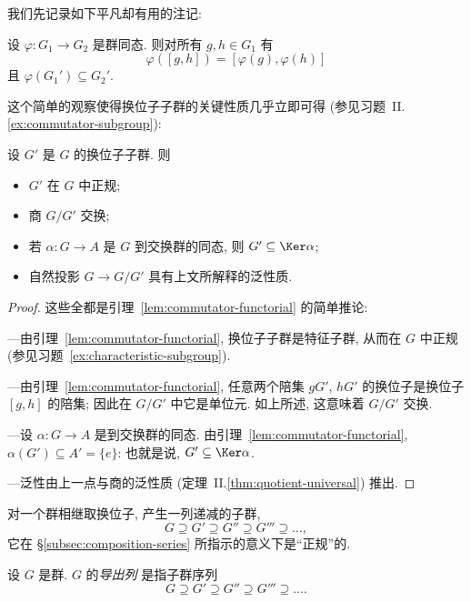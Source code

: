 我们先记录如下平凡却有用的注记:

\begin{lemma}
\label{lem:commutator-functorial}
设 $\varphi : G_1 \to G_2$ 是群同态. 则对所有 $g, h \in G_1$ 有
\[
\varphi([g,h]) = [\varphi(g), \varphi(h)]
\]
且 $\varphi(G_1') \subseteq G_2'$.
\end{lemma}

这个简单的观察使得换位子子群的关键性质几乎立即可得 (参见习题~II.\ref{ex:commutator-subgroup}):

\begin{proposition}
\label{prop:commutator-properties}
设 $G'$ 是 $G$ 的换位子子群. 则
\begin{itemize}
\item $G'$ 在 $G$ 中正规;
\item 商 $G/G'$ 交换;
\item 若 $\alpha : G \to A$ 是 $G$ 到交换群的同态, 则 $G' \subseteq \Ker \alpha$;
\item 自然投影 $G \to G/G'$ 具有上文所解释的泛性质.
\end{itemize}
\end{proposition}

\begin{proof}
这些全都是引理~\ref{lem:commutator-functorial} 的简单推论:

---由引理~\ref{lem:commutator-functorial}, 换位子子群是特征子群, 从而在 $G$ 中正规 (参见习题~\ref{ex:characteristic-subgroup}).

---由引理~\ref{lem:commutator-functorial}, 任意两个陪集 $gG'$, $hG'$ 的换位子是换位子 $[g,h]$ 的陪集; 因此在 $G/G'$ 中它是单位元. 如上所述, 这意味着 $G/G'$ 交换.

---设 $\alpha : G \to A$ 是到交换群的同态. 由引理~\ref{lem:commutator-functorial}, $\alpha(G') \subseteq A' = \{e\}$: 也就是说, $G' \subseteq \Ker \alpha$.

---泛性由上一点与商的泛性质 (定理~II.\ref{thm:quotient-universal}) 推出.
\end{proof}

对一个群相继取换位子, 产生一列递减的子群,
\[
G \supseteq G' \supseteq G'' \supseteq G''' \supseteq \dots,
\]
它在 \S\ref{subsec:composition-series} 所指示的意义下是``正规''的.

\begin{definition}
\label{def:derived-series}
设 $G$ 是群. $G$ 的\emph{导出列}%
是指子群序列
\[
G \supseteq G' \supseteq G'' \supseteq G''' \supseteq \dots.
\]
\end{definition}

